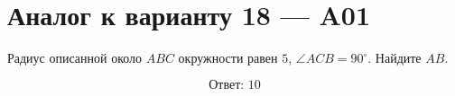 


\section*{Аналог к варианту 18 — A01}
Радиус описанной около \(ABC\) окружности равен \(5\), \(\angle ACB=90^\circ\). Найдите \(AB\).
\begin{center}\end{center}
\[\boxed{\text{Ответ: }10}\]


